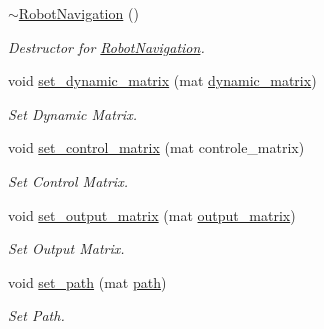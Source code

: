 \begin{DoxyCompactItemize}
\hyperlink{class_robot_navigation_af29a5bb696c20ee7c8ced94f2c33b893}{$\sim$\+Robot\+Navigation} ()
\begin{DoxyCompactList}\small\item\em Destructor for \hyperlink{class_robot_navigation}{Robot\+Navigation}. \end{DoxyCompactList}\item 
\mbox{\label{class_robot_navigation_aaed78c0f698c9f29760979b654caa162}} 
void \hyperlink{class_robot_navigation_aaed78c0f698c9f29760979b654caa162}{set\+\_\+dynamic\+\_\+matrix} (mat \hyperlink{class_robot_navigation_a1aad778b34e54f7fc85ec3ed744a444c}{dynamic\+\_\+matrix})
\begin{DoxyCompactList}\small\item\em Set Dynamic Matrix. \end{DoxyCompactList}\item 
\mbox{\label{class_robot_navigation_a3c82191207173bcd52cec1ccf7d6e16c}} 
void \hyperlink{class_robot_navigation_a3c82191207173bcd52cec1ccf7d6e16c}{set\+\_\+control\+\_\+matrix} (mat controle\+\_\+matrix)
\begin{DoxyCompactList}\small\item\em Set Control Matrix. \end{DoxyCompactList}\item 
\mbox{\label{class_robot_navigation_a691f4f615b422d3a9dfa2e9b6a24f8e2}} 
void \hyperlink{class_robot_navigation_a691f4f615b422d3a9dfa2e9b6a24f8e2}{set\+\_\+output\+\_\+matrix} (mat \hyperlink{class_robot_navigation_a30f84b9b191d662b8d6c5ba9ab4e665b}{output\+\_\+matrix})
\begin{DoxyCompactList}\small\item\em Set Output Matrix. \end{DoxyCompactList}\item 
\mbox{\label{class_robot_navigation_a02aa1b1145036f574a06384d30f7f09e}} 
void \hyperlink{class_robot_navigation_a02aa1b1145036f574a06384d30f7f09e}{set\+\_\+path} (mat \hyperlink{class_robot_navigation_ac427c1bf3d5df9b984f9dfe4241d1454}{path})
\begin{DoxyCompactList}\small\item\em Set Path. \end{DoxyCompactList}\item 

\end{DoxyCompactItemize}
